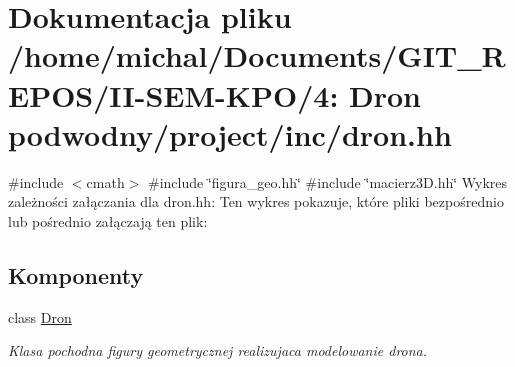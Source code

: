 \hypertarget{dron_8hh}{}\section{Dokumentacja pliku /home/michal/\+Documents/\+G\+I\+T\+\_\+\+R\+E\+P\+O\+S/\+I\+I-\/\+S\+E\+M-\/\+K\+P\+O/4\+: Dron podwodny/project/inc/dron.hh}
\label{dron_8hh}
{\ttfamily \#include $<$cmath$>$}\newline
{\ttfamily \#include \char`\"{}figura\+\_\+geo.\+hh\char`\"{}}\newline
{\ttfamily \#include \char`\"{}macierz3\+D.\+hh\char`\"{}}\newline
Wykres zależności załączania dla dron.\+hh\+:
Ten wykres pokazuje, które pliki bezpośrednio lub pośrednio załączają ten plik\+:
\subsection*{Komponenty}
\begin{DoxyCompactItemize}
\item 
class \hyperlink{class_dron}{Dron}
\begin{DoxyCompactList}\small\item\em Klasa pochodna figury geometrycznej realizujaca modelowanie drona. \end{DoxyCompactList}\end{DoxyCompactItemize}
